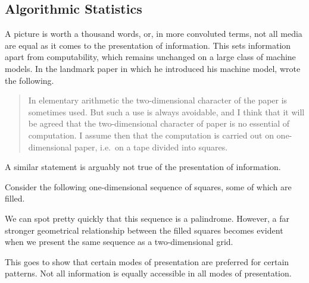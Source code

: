 \subsection{Algorithmic Statistics}
A picture is worth a thousand words, or, in more convoluted terms, not all media are equal as it comes to the presentation of information.
This sets information apart from computability, which remains unchanged on a large class of machine models.
In the landmark paper in which he introduced his machine model, \citeauthor{turing1937computable} wrote the following.
\blockcquote{turing1937computable}{
  In elementary arithmetic the two-dimensional character of the paper is sometimes used.
  But such a use is always avoidable, and I think that it will be agreed that the two-dimensional character of paper is no essential of computation.
  I assume then that the computation is carried out on one-dimensional paper, i.e.~on a tape divided into squares.
}
A similar statement is arguably not true of the presentation of information.

\begin{example}
  Consider the following one-dimensional sequence of squares, some of which are filled.
  \begin{center}
  \end{center}
  We can spot pretty quickly that this sequence is a palindrome.
  However, a far stronger geometrical relationship between the filled squares becomes evident when we present the same sequence as a two-dimensional grid.
  \begin{center}
  \end{center}
  This goes to show that certain modes of presentation are preferred for certain patterns.
  Not all information is equally accessible in all modes of presentation.
\end{example}

